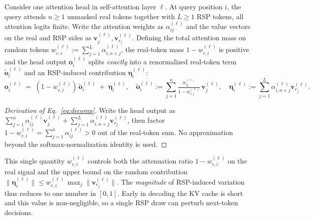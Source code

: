 Consider one attention head in self-attention layer $\ell$. At query position $i$, the query attends $n\ge1$ unmasked real tokens together with $L\ge1$ RSP tokens, all attention logits finite. Write the attention weights as $\alpha_{ij}^{(\ell)}$ and the value vectors on the real and RSP sides as $\mathbf{v}_j^{(\ell)},\mathbf{v}_{r_j}^{(\ell)}$. Defining the total attention mass on random tokens $w_{r,i}^{(\ell)} := \sum_{j=1}^L \alpha_{i,n+j}^{(\ell)}$, the real-token mass $1-w_{r,i}^{(\ell)}$ is positive and the head output $\mathbf{o}_i^{(\ell)}$ splits \emph{exactly} into a renormalized real-token term $\tilde{\mathbf{o}}_i^{(\ell)}$ and an RSP-induced contribution $\boldsymbol{\eta}_i^{(\ell)}$:
\begin{equation}\label{eq:decomp}
\mathbf{o}_i^{(\ell)}
\;=\;
(1-w_{r,i}^{(\ell)})\,\tilde{\mathbf{o}}_i^{(\ell)}
\;+\;
\boldsymbol{\eta}_i^{(\ell)},
\quad
\tilde{\mathbf{o}}_i^{(\ell)} := \sum_{j=1}^n \tfrac{\alpha_{ij}^{(\ell)}}{1-w_{r,i}^{(\ell)}}\,\mathbf{v}_j^{(\ell)},
\quad
\boldsymbol{\eta}_i^{(\ell)} := \sum_{j=1}^L \alpha_{i,n+j}^{(\ell)}\mathbf{v}_{r_j}^{(\ell)}.
\end{equation}

\begin{proof}[Derivation of Eq.~\eqref{eq:decomp}]
Write the head output as $\sum_{j=1}^{n}\alpha_{ij}^{(\ell)}\mathbf{v}_{j}^{(\ell)}+\sum_{j=1}^{L}\alpha_{i,n+j}^{(\ell)}\mathbf{v}_{r_j}^{(\ell)}$, then factor $1-w_{r,i}^{(\ell)} = \sum_{j=1}^n \alpha_{ij}^{(\ell)}>0$ out of the real-token sum. No approximation beyond the softmax-normalization identity is used.
\end{proof}

This single quantity $w_{r,i}^{(\ell)}$ controls both the attenuation ratio $1-w_{r,i}^{(\ell)}$ on the real signal and the upper bound on the random contribution $\|\boldsymbol{\eta}_i^{(\ell)}\| \le w_{r,i}^{(\ell)}\,\max_j \|\mathbf{v}_{r_j}^{(\ell)}\|$. The \emph{magnitude} of RSP-induced variation thus reduces to one number in $[0,1]$. Early in decoding the KV cache is short and this value is non-negligible, so a single RSP draw can perturb next-token decisions.

